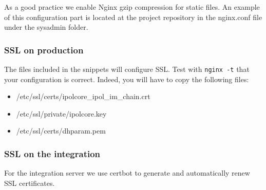 \documentclass[a4paper,12pt]{article}
\begin{document}
\begin{enumerate}
\begin{enumerate}
\begin{enumerate}
    \end{enumerate}
    \end{enumerate}
\end{enumerate}

As a good practice we enable Nginx gzip compression for static files. An example of this configuration part is located at the project repository in the nginx.conf file under the sysadmin folder.

\subsubsection{SSL on production}
The files included in the snippets will configure SSL. Test with {\tt nginx -t} that your configuration is correct. Indeed, you will have to copy the following files:
\begin{itemize}
    \item /etc/ssl/certs/ipolcore\_ipol\_im\_chain.crt
    \item /etc/ssl/private/ipolcore.key
    \item /etc/ssl/certs/dhparam.pem
\end{itemize}



\subsubsection{SSL on the integration}
For the integration server we use certbot to generate and automatically renew SSL certificates.
\end{document}
